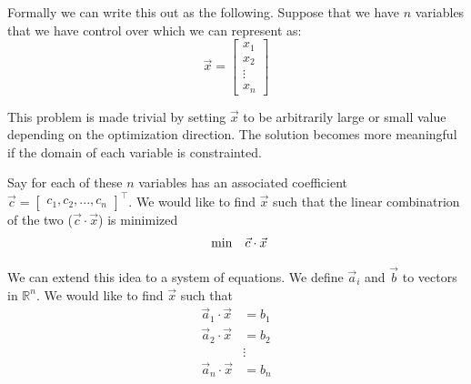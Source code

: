 \documentclass{article}
\begin{document}
Formally we can write this out as the following. Suppose that we have \( n \) variables that we have control over which we can represent as:
\[
\vec{x} = \begin{bmatrix} x_1 \\ x_2 \\ \vdots \\ x_n \end{bmatrix}
\]

This problem is made trivial by setting \( \vec{x} \) to be arbitrarily large or small value depending on the optimization direction.
The solution becomes more meaningful if the domain of each variable is constrainted.

Say for each of these \( n \) variables has an associated coefficient \( \vec{c} = \begin{bmatrix} c_1, c_2, ..., c_n  \end{bmatrix}^\top \).
We would like to find \( \vec{x} \) such that the linear combinatrion of the two (\( \vec{c} \cdot \vec{x} \)) is minimized
\begin{align*}
  \begin{array}{ll@{}ll}
  \min  & \vec{c} \cdot \vec{x}
  \end{array}
\end{align*}

We can extend this idea to a system of equations. We define \( \vec{a}_i \) and \( \vec{b} \) to vectors in $\mathbb{R}^n$. We would like to find \( \vec{x} \) such that
\begin{align*}
\vec{a}_1 \cdot \vec{x} &= b_1 \\
\vec{a}_2 \cdot \vec{x} &= b_2 \\
& \vdots  \\
\vec{a}_n \cdot \vec{x} &= b_n \\
\end{align*}
\end{document}

